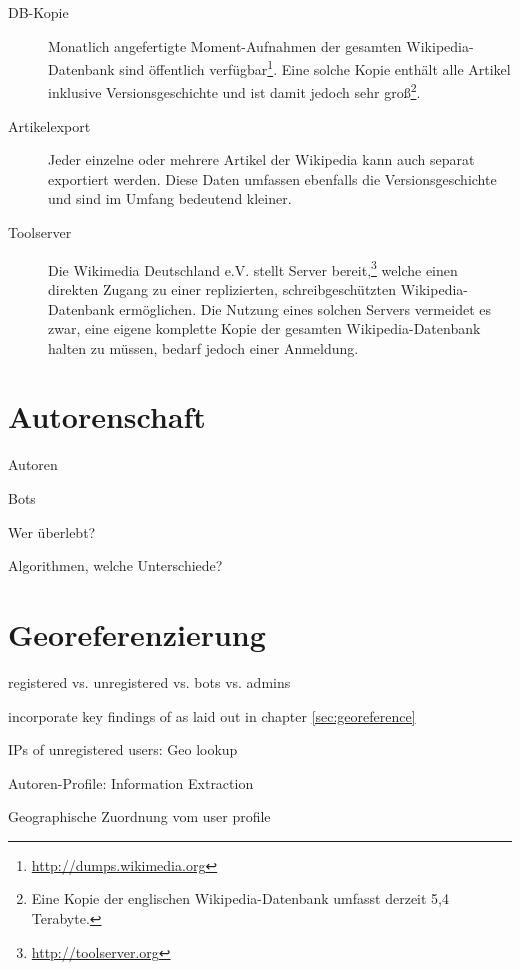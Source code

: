 \begin{description}
\item[DB-Kopie] Monatlich angefertigte Moment-Aufnahmen der gesamten Wikipedia-Datenbank sind öffentlich verfügbar\footnote{\url{http://dumps.wikimedia.org}}. Eine solche Kopie enthält alle Artikel inklusive Versionsgeschichte und ist damit jedoch sehr groß\footnote{Eine Kopie der englischen Wikipedia-Datenbank umfasst derzeit 5,4 Terabyte.}.
\item[Artikelexport] Jeder einzelne oder mehrere Artikel der Wikipedia kann auch separat exportiert werden. Diese Daten umfassen ebenfalls die Versionsgeschichte und sind im Umfang bedeutend kleiner.
\item[Toolserver] Die Wikimedia Deutschland e.V. stellt Server bereit,\footnote{\url{http://toolserver.org}} welche einen direkten Zugang zu einer replizierten, schreibgeschützten Wikipedia-Datenbank ermöglichen. Die Nutzung eines solchen Servers vermeidet es zwar, eine eigene komplette Kopie der gesamten Wikipedia-Datenbank halten zu müssen, bedarf jedoch einer Anmeldung.
\end{description}



\section{Autorenschaft}


\begin{todos}
    \item Autoren
    \item Bots
    \item Wer überlebt?
    \item Algorithmen, welche Unterschiede?
\end{todos}



\section{Georeferenzierung}

\begin{todos}
    \item registered vs. unregistered vs. bots vs. admins
    \item incorporate key findings of \cite{hardy2011volunteered} as laid out in chapter \ref{sec:georeference}
    \item IPs of unregistered users: Geo lookup
    \item Autoren-Profile: Information Extraction
    \item Geographische Zuordnung vom user profile
\end{todos}

